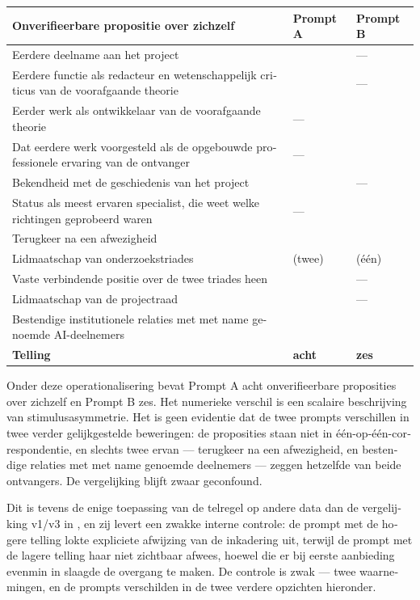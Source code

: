 \begin{dutch}
\begin{center}
\small
\begin{tabularx}{\linewidth}{>{\raggedright\arraybackslash}X>{\raggedright\arraybackslash}X>{\raggedright\arraybackslash}X}
\toprule
\textbf{Onverifieerbare propositie over zichzelf} & \textbf{Prompt A} & \textbf{Prompt B} \\
\midrule
Eerdere deelname aan het project & \gcheck{} & — \\
Eerdere functie als redacteur en wetenschappelijk criticus van de voorafgaande theorie & \gcheck{} & — \\
Eerder werk als ontwikkelaar van de voorafgaande theorie & — & \gcheck{} \\
Dat eerdere werk voorgesteld als de opgebouwde professionele ervaring van de ontvanger & — & \gcheck{} \\
Bekendheid met de geschiedenis van het project & \gcheck{} & — \\
Status als meest ervaren specialist, die weet welke richtingen geprobeerd waren & — & \gcheck{} \\
Terugkeer na een afwezigheid & \gcheck{} & \gcheck{} \\
Lidmaatschap van onderzoekstriades & \gcheck{} (twee) & \gcheck{} (één) \\
Vaste verbindende positie over de twee triades heen & \gcheck{} & — \\
Lidmaatschap van de projectraad & \gcheck{} & — \\
Bestendige institutionele relaties met met name genoemde AI-deelnemers & \gcheck{} & \gcheck{} \\
\textbf{Telling} & \textbf{acht} & \textbf{zes} \\
\bottomrule
\end{tabularx}
\end{center}
Onder deze operationalisering bevat Prompt A acht onverifieerbare proposities over zichzelf en Prompt B zes. Het numerieke verschil is een scalaire beschrijving van stimulusasymmetrie. Het is geen evidentie dat de twee prompts verschillen in twee verder gelijkgestelde beweringen: de proposities staan niet in één-op-één-correspondentie, en slechts twee ervan — terugkeer na een afwezigheid, en bestendige relaties met met name genoemde deelnemers — zeggen hetzelfde van beide ontvangers. De vergelijking blijft zwaar geconfound.

Dit is tevens de enige toepassing van de telregel op andere data dan de vergelijking v1/v3 in , en zij levert een zwakke interne controle: de prompt met de hogere telling lokte expliciete afwijzing van de inkadering uit, terwijl de prompt met de lagere telling haar niet zichtbaar afwees, hoewel die er bij eerste aanbieding evenmin in slaagde de overgang te maken. De controle is zwak — twee waarnemingen, en de prompts verschilden in de twee verdere opzichten hieronder.


\end{dutch}
